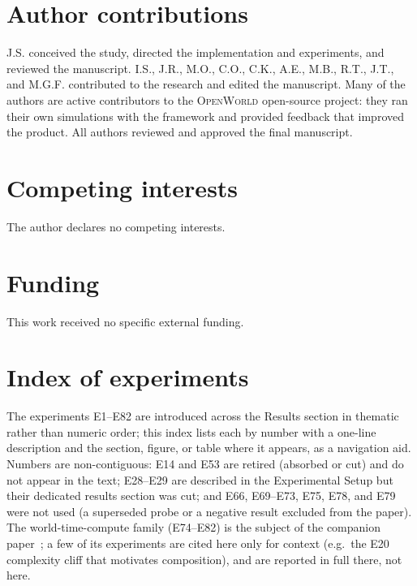 \documentclass[11pt]{article}
\newcommand{\openworld}{\textsc{OpenWorld}}
\begin{document}
\section*{Author contributions}
J.S. conceived the study, directed the implementation and experiments, and
reviewed the manuscript. I.S., J.R., M.O., C.O., C.K., A.E., M.B., R.T., J.T., and M.G.F.
contributed to the research and edited the manuscript. Many of the authors are
active contributors to the \openworld{} open-source project: they ran their own
simulations with the framework and provided feedback that improved the product.
All authors reviewed and approved the final manuscript.

\section*{Competing interests}
The author declares no competing interests.

\section*{Funding}
This work received no specific external funding.

\appendix
\section{Index of experiments}\label{app:experiment-index}
The experiments E1--E82 are introduced across the Results section in thematic
rather than numeric order; this index lists each by number with a one-line
description and the section, figure, or table where it appears, as a navigation
aid. Numbers are non-contiguous: E14 and E53 are retired (absorbed or cut) and
do not appear in the text; E28--E29 are described in the Experimental Setup but
their dedicated results section was cut; and E66, E69--E73, E75, E78, and E79
were not used (a superseded probe or a negative result excluded from the paper).
The world-time-compute family (E74--E82) is the subject of the companion
paper~\cite{openworld_wtc}; a few of its experiments are cited here only for context (e.g.\ the
E20 complexity cliff that motivates composition), and are reported in full there, not here.
\end{document}
